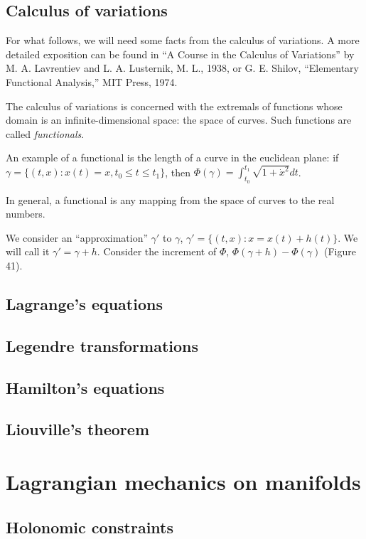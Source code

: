 \documentclass[leqno]{report}
\numberwithin{equation}{section}
\theoremstyle{plain}
\theoremstyle{definition}
\theoremstyle{remark}
\theoremstyle{smallcap}
\numberwithin{prob}{section}
\begin{document}
\section{Calculus of variations}

For what follows, we will need some facts from the calculus of variations.
%
A more detailed exposition can be found in
``A Course in the Calculus of Variations''
by M. A. Lavrentiev and L. A. Lusternik, M. L., 1938,
or
G. E. Shilov, ``Elementary Functional Analysis,''
MIT Press, 1974.


The calculus of variations is concerned with the extremals of
functions whose domain is an infinite-dimensional space:
the space of curves.
%
Such functions are called \emph{functionals}.

An example of a functional is the length of a curve in the euclidean plane:
if $\gamma = \{(t, x): x(t) = x,  t_0 \le t \le t_1 \}$,
then $\Phi(\gamma) = \int_{t_0}^{t_1} \sqrt{1 + {\dot x}^2 } dt$.

In general, a functional is any mapping from the space of curves
to the real numbers.

We consider an ``approximation'' $\gamma'$ to $\gamma$,
$\gamma' = \{(t, x): x = x(t) + h(t)\}$.
%
We will call it $\gamma' = \gamma + h$.
Consider the increment of $\Phi$,
$\Phi(\gamma + h) - \Phi(\gamma)$
(Figure 41).

\section{Lagrange's equations}

\section{Legendre transformations}

\section{Hamilton's equations}

\section{Liouville's theorem}

\chapter{Lagrangian mechanics on manifolds}

\section{Holonomic constraints}
\end{document}
